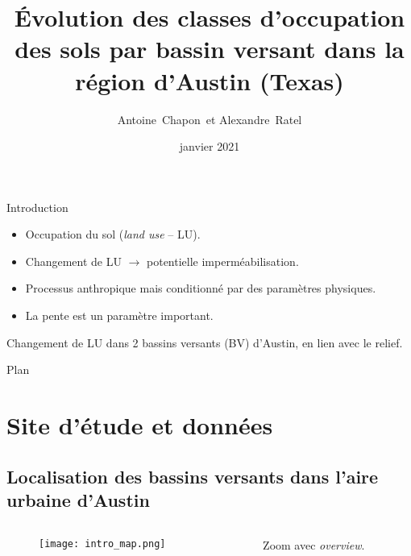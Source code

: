\documentclass[aspectratio=169]{beamer}
\date{janvier 2021}
\title{Évolution des classes d\rq{}occupation des sols par bassin versant dans la région d\rq{}Austin (Texas)}
\author{Antoine~Chapon~et Alexandre~Ratel}
\institute[Universities of Somewhere and Elsewhere] %
{
  Master 2 Gestion Durable des Hydrogéosystèmes\\
  Université de Rouen
 }
\begin{document}
\begin{frame}
  \titlepage
\end{frame}



\section*{}

\begin{frame}{Introduction}
	\begin{itemize}
	\setlength{\itemsep}{10pt}
	\item Occupation du sol (\emph{land use} -- LU).
	\item Changement de LU $\rightarrow$ potentielle imperméabilisation.
	\item Processus anthropique mais conditionné par des paramètres physiques.
	\item La pente est un paramètre important.
	\end{itemize}
\vspace{0.5cm}
Changement de LU dans 2 bassins versants (BV) d\rq{}Austin, en lien avec le relief.\\
\vspace{0.5cm}
		{\scriptsize
		\cite{united_states_environmental_protection_agency_land_2017, exum_estimating_2005, fu_temporal_2006}}
\end{frame}

\begin{frame}{Plan}
\tableofcontents
\end{frame}


\section{Site d\rq{}étude et données}

\subsection{Localisation des bassins versants dans l\rq{}aire urbaine d\rq{}Austin}

\begin{frame}
\begin{columns}
	\begin{column}{0.75\textwidth}
		\begin{figure}
	 		\texttt{[image: intro\_map.png]}
		\end{figure}
	\end{column}
	\begin{column}{0.25\textwidth}
             	Zoom avec \emph{overview}.\\
		\vspace{1cm}
		{\scriptsize
		\cite{united_states_census_bureau_census_2020, united_states_census_bureau_us_2021}}
	\end{column}
\end{columns}
\end{frame}
\end{document}
